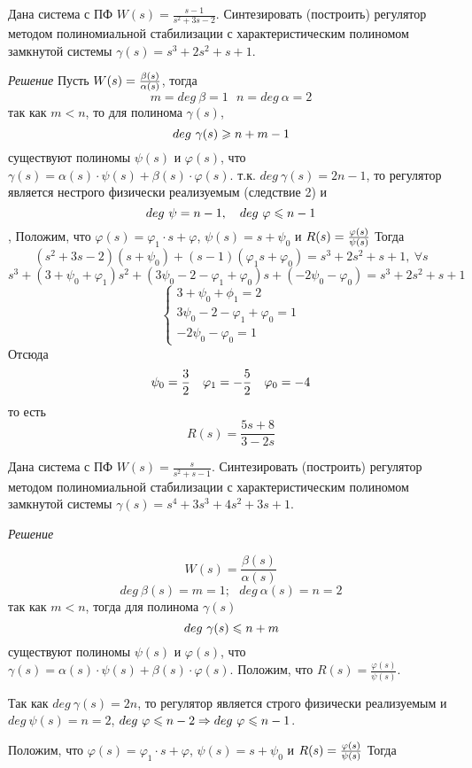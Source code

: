 \documentclass[../../TAU.tex]{subfiles}
\begin{document}
    \examp
    {
        Дана система с ПФ $W(s) = \frac{s-1}{s^2+3s-2}$. Синтезировать (построить) регулятор методом полиномиальной стабилизации с характеристическим полиномом замкнутой системы $\gamma(s) = s^3+2s^2+s+1$.
    }

    \textit{Решение}
    {
        Пусть $W(s) = {\beta(s)\over \alpha(s)}$, тогда
        $$
            m=deg\ \beta =1 \ \ \ n=deg\ \alpha=2
        $$
        так как $m<n$, то для полинома $\gamma(s)$,
        $$
            deg\ \gamma(s) \geqslant n + m - 1
        $$
        существуют полиномы $\psi(s)$ и $\varphi(s)$, что $\gamma(s)=\alpha(s)\cdot\psi(s)+\beta(s)\cdot\varphi(s)$.
        т.к. $deg\ \gamma(s)=2n-1$, то регулятор является нестрого физически реализуемым (следствие 2) и
        $$
            deg\ \psi=n-1,\ \ \  deg\ \varphi \leqslant n-1
        $$,
        Положим, что $\varphi(s)=\varphi_1\cdot s+\varphi$, $\psi(s)=s+\psi_0$ и 
        $R(s)={\varphi(s)\over\psi(s)}$
        Тогда
        $$
            (s^2+3s-2)(s+\psi_0)+(s-1)(\varphi_1s+\varphi_0)=s^3+2s^2+s+1,\ \forall s
        $$ 
        $$
            s^3+(3+\psi_0+\varphi_1)s^2+(3\psi_0-2-\varphi_1+\varphi_0)s+(-2\psi_0-\varphi_0)=s^3+2s^2+s+1
        $$
        $$
        \begin{cases}
            3+\psi_0+\phi_1=2 \\
            3\psi_0-2-\varphi_1+\varphi_0=1 \\
            -2\psi_0-\varphi_0=1
        \end{cases}
        $$
        Отсюда
        $$
            \psi_0={3\over2} \ \ \ \varphi_1= -{5\over2} \ \ \  \varphi_0=-4
        $$
        то есть
        $$
            R(s)=\frac{5s+8}{3-2s}
        $$
    }

    \examp
    {
        Дана система с ПФ $W(s) = \frac{s}{s^2+s-1}$. Синтезировать (построить) регулятор методом полиномиальной стабилизации с характеристическим полиномом замкнутой системы $\gamma(s) = s^4+3s^3+4s^2+3s+1$.
    }

    \textit{Решение}
    {
        $$
            W(s)=\frac{\beta(s)}{\alpha(s)}
        $$
        $$
            deg\ \beta(s)=m=1;\ \ \ deg\ \alpha(s)=n=2
        $$
        так как $m<n$, тогда для полинома $\gamma(s)$
        $$
            deg\ \gamma(s)\leqslant n+m
        $$
        существуют полиномы $\psi(s)$ и $\varphi(s)$, что $\gamma(s)=\alpha(s)\cdot\psi(s)+\beta(s)\cdot\varphi(s)$.
        Положим, что $R(s)=\frac{\varphi(s)}{\psi(s)}$.


        Так как $deg\ \gamma(s)=2n$, то регулятор является строго физически реализуемым и $deg\ \psi(s)=n=2$, $deg\ \varphi\lse n-2\Rightarrow deg\ \varphi\lse n-1$.

        Положим, что $\varphi(s)=\varphi_1\cdot s+\varphi$, $\psi(s)=s+\psi_0$ и 
        $R(s)={\varphi(s)\over\psi(s)}$
        Тогда

    }
\end{document}
